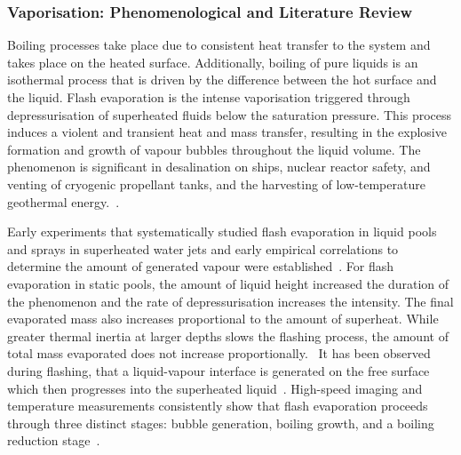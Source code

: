 \subsubsection{Vaporisation: Phenomenological and Literature Review}
Boiling processes take place due to consistent heat transfer to the system and takes place on the heated surface. 
 Additionally, boiling of pure liquids is an isothermal process that is 
 driven by the difference between the hot surface and the liquid. 
 Flash evaporation is the intense vaporisation triggered through depressurisation 
 of superheated fluids below the saturation pressure.
 This process induces a violent and transient heat
 and mass transfer, resulting in the explosive formation and growth
 of vapour bubbles throughout the liquid volume. The phenomenon is significant 
 in desalination on ships, nuclear reactor safety, and venting of cryogenic
 propellant tanks, and the harvesting of low-temperature geothermal energy.~\cite{sauryExperimentalStudyFlash2002, wuExperimentalStudyFlash2019, liaoReviewNumericalModelling2021, mutairExperimentalInvestigationCharacteristics2010, vahajiEfficiencyTwophaseNozzle2014}.

Early experiments that systematically studied flash evaporation in liquid pools and sprays in superheated 
 water jets and early empirical correlations to determine the amount of generated 
 vapour were established~\cite{miyatakeExperimentalStudySpray1981, miyatakeEffectLiquidTemperature1981, gopalakrishnaExperimentalStudyFlash1987, petersonInvestigationsLiquidflashingEvaporation1984}. 
 For flash evaporation in static pools, the amount of liquid height increased the duration 
 of the phenomenon and the rate of depressurisation increases the intensity.
 The final evaporated mass also increases proportional to the amount of superheat.
 While greater thermal inertia at larger depths slows the flashing process, the amount of total 
 mass evaporated does not increase proportionally.~\cite{sauryFlashEvaporationWater2005,sauryExperimentalStudyFlash2002}
 It has been observed during flashing, that a liquid-vapour interface is generated 
 on the free surface which then progresses into the superheated liquid~\cite{mansourReviewFlashEvaporation2019, HahneBarthau2000, reinkeExplosiveVaporizationSuperheated2001}.
 High-speed imaging and temperature measurements consistently show that
 flash evaporation proceeds through three distinct stages: bubble generation,
 boiling growth, and a boiling reduction stage~\cite{wuExperimentalStudyFlash2019}.

